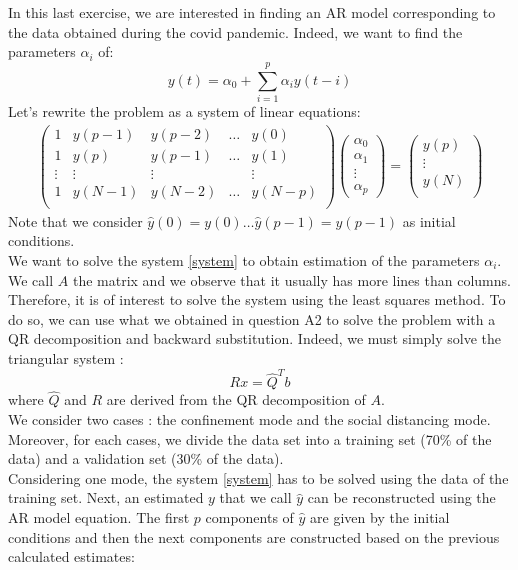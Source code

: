 \documentclass[11pt]{article}
\begin{document}
In this last exercise, we are interested in finding an AR model corresponding to the data obtained during the covid pandemic. Indeed, we want to find the parameters $\alpha_i$ of:
\[y(t) = \alpha_0 + \sum_{i=1}^p \alpha_iy(t-i)
\]
Let's rewrite the problem as a system of linear equations:
\begin{align}\label{system}
\begin{pmatrix}
1 & y(p-1)& y(p-2)&\dots& y(0)\\
1 & y(p)&y(p-1)&\dots& y(1)\\
\vdots&\vdots &\vdots&&\vdots\\
1& y(N-1)&y(N-2)&\dots& y(N-p)\\
\end{pmatrix}
\begin{pmatrix}
\alpha_0\\
\alpha_1\\
\vdots\\
\alpha_p
\end{pmatrix}
=
\begin{pmatrix}
y(p)\\
\vdots\\
y(N)\\
\end{pmatrix}
\end{align}
Note that we consider $\hat{y}(0) = y(0)\dots \hat{y}(p-1) = y(p-1)$ as initial conditions.\\ 
We want to solve the system \eqref{system} to obtain estimation of the parameters $\alpha_i$. We call $A$ the matrix and we observe that it usually has more lines than columns. Therefore, it is of interest to solve the system using the least squares method. To do so, we can use what we obtained in question A2 to solve the problem with a QR decomposition and backward substitution. Indeed, we must simply solve the triangular system :
\begin{equation*}
    Rx = \hat{Q}^Tb
\end{equation*}
where $\hat{Q}$ and $R$ are derived from the QR decomposition of $A$.\\
We consider two cases : the confinement mode and the social distancing mode. Moreover, for each cases, we divide the data set into a training set (70\% of the data) and a validation set (30\% of the data).\\
Considering one mode, the system \eqref{system} has to be solved using the data of the training set. Next, an estimated $y$ that we call $\hat{y}$ can be reconstructed using the AR model equation. The first $p$ components of $\hat{y}$ are given by the initial conditions and then the next components are constructed based on the previous calculated estimates:
\end{document}
